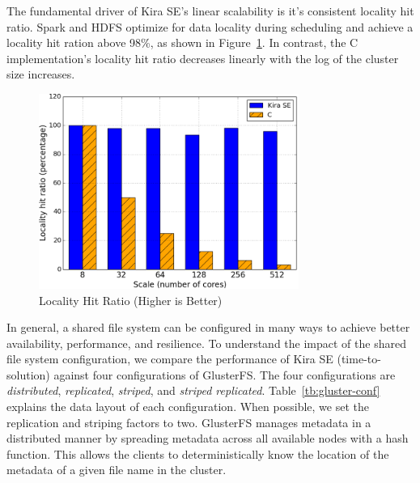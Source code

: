 \documentclass[10pt, conference, compsocconf]{IEEEtran}
\newcommand{\up}{\vspace*{-1em}}
\begin{document}
The fundamental driver of Kira SE's linear scalability is it's consistent locality
hit ratio. Spark and HDFS optimize for data locality during scheduling and achieve a
locality hit ration above 98\%, as shown in Figure~\ref{fig:locality}. In contrast, the
C implementation's locality hit ratio decreases linearly with the log of the cluster
size increases.

\begin{figure}[h]
	\begin{center}
		\includegraphics[width=85mm]{pictures/locality}
		\caption{Locality Hit Ratio (Higher is Better)
		\label{fig:locality}}
		\up
  	\end{center}
\end{figure}

In general, a shared file system can be configured in many ways to achieve better
availability, performance, and resilience. To understand the impact of the shared
file system configuration, we compare the performance of Kira SE (time-to-solution)
against four configurations of GlusterFS. The four configurations are
\emph{distributed}, \emph{replicated}, \emph{striped}, and \emph{striped replicated}. 
Table~\ref{tb:gluster-conf} explains the data layout of each configuration.
When possible, we set the replication and striping factors to two.
GlusterFS manages metadata in a distributed manner by spreading metadata across
all available nodes with a hash function. This allows the clients to deterministically
know the location of the metadata of a given file name in the cluster.
\end{document}
